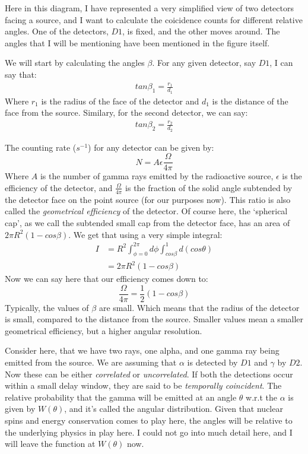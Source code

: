 \documentclass{double}
\begin{document}
\begin{multicols*}{2}
Here in this diagram, I have represented a very simplified
view of two detectors facing a source, and I want to
calculate the coicidence counts for different relative
angles. One of the detectors, $D1$, is fixed, and the other
moves around. The angles that I will be mentioning have been
mentioned in the figure itself. 

We will start by calculating the angles $\beta$. For any
given detector, say $D1$, I can say that:
\begin{align}
   tan \beta_1 = \frac{r_1}{d_1}
\end{align}
\noindent Where $r_1$ is the radius of the face of the detector and
$d_1$ is the distance of the face from the source. Similary,
for the second detector, we can say:
\begin{align}
   tan \beta_2 = \frac{r_2}{d_2}
\end{align}

\noindent The counting rate ($s^{-1}$) for any detector can
be given by:
\begin{equation}
    N = A\epsilon \frac{\Omega}{4\pi}
\end{equation}
\noindent Where $A$ is the number of gamma rays emitted by
the radioactive source, $\epsilon$ is the efficiency of the
detector, and $\frac{\Omega}{4\pi}$ is the fraction of the
solid angle subtended by the detector face on the point
source (for our purposes now). This ratio is also called the
\emph{geometrical efficiency} of the detector. Of course
here, the `spherical cap', as we call the subtended small
cap from the detector face, has an area of $2\pi
R^2(1-cos\beta)$. We get that using a very simple integral:
\begin{align}
    I &= R^2 \int_{\phi = 0}^{2\pi} d\phi \int _{cos \beta}^{1}
    d(cos\theta) \nonumber\\
    &= 2\pi R^2 (1 - cos\beta)
\end{align}
\noindent Now we can say here that our efficiency comes down
to:
\begin{equation}
    \frac{\Omega}{4\pi} = \frac{1}{2}(1-cos\beta)
\end{equation}
\noindent Typically, the values of $\beta$ are small. Which
means that the radius of the detector is small, compared to
the distance from the source. Smaller values mean a smaller
geometrical efficiency, but a higher angular resolution.

Consider here, that we have two rays, one alpha, and one
gamma ray being emitted from the source. We are assuming
that $\alpha$ is detected by $D1$ and $\gamma$ by $D2$. Now
these can be either \emph{correlated} or
\emph{uncorrelated}. If both the detections occur within a
small delay window, they are said to be \emph{temporally
coincident}. The relative probability that the gamma will be
emitted at an angle $\theta$ w.r.t the $\alpha$ is given by
$W(\theta)$, and it's called the angular distribution. Given
that nuclear spins and energy conservation comes to play
here, the angles will be relative to the underlying physics
in play here. I could not go into much detail here, and I
will leave the function at $W(\theta)$ now. 


\end{multicols*}
\end{document}

